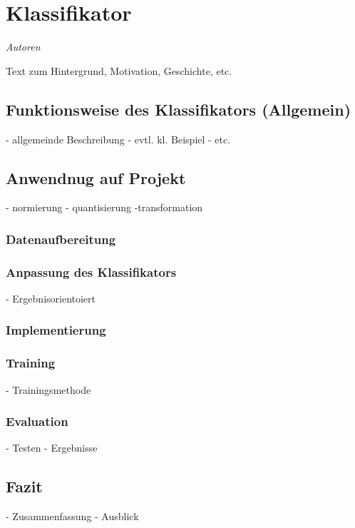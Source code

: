 \section{Klassifikator}
\textit{Autoren}

Text zum Hintergrund, Motivation, Geschichte, etc. 

\subsection{Funktionsweise des Klassifikators (Allgemein)}
- allgemeinde Beschreibung
- evtl. kl. Beispiel
- etc. 

\subsection{Anwendnug auf Projekt}
- normierung
- quantisierung
-transformation

\subsubsection{Datenaufbereitung}

\subsubsection{Anpassung des Klassifikators}
- Ergebnisorientoiert

\subsubsection{Implementierung}

\subsubsection{Training}
- Trainingsmethode

\subsubsection{Evaluation}
- Testen
- Ergebnisse

\subsection{Fazit}
- Zusammenfassung 
- Ausblick